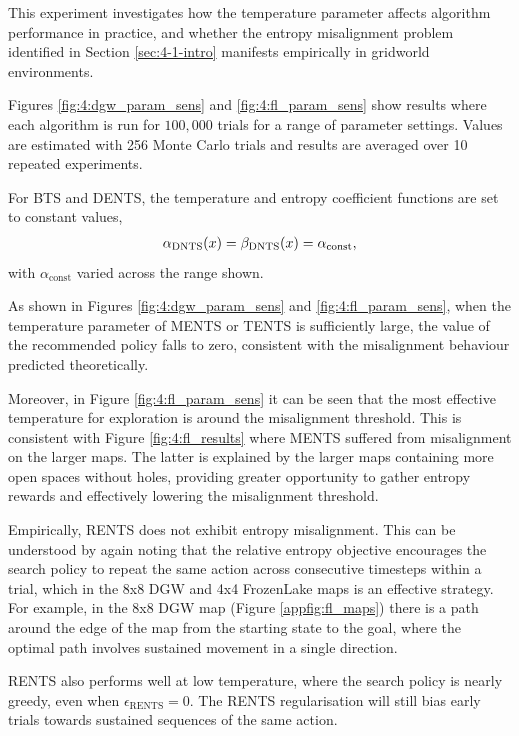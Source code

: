     This experiment investigates how the temperature parameter affects algorithm performance in practice, and whether the entropy misalignment problem identified in Section \ref{sec:4-1-intro} manifests empirically in gridworld environments.

    Figures \ref{fig:4:dgw_param_sens} and \ref{fig:4:fl_param_sens} show results where each algorithm is run for $100{,}000$ trials for a range of parameter settings. Values are estimated with 256 Monte Carlo trials and results are averaged over 10 repeated experiments.

    For BTS and DENTS, the temperature and entropy coefficient functions are set to constant values, 
    \begin{align}
        {\alpha_{{\textnormal{DNTS}}}}(x) = {\beta_{{\textnormal{DNTS}}}}(x) = \alpha_{\text{const}},
    \end{align} 
    with $\alpha_{\text{const}}$ varied across the range shown.
    
    As shown in Figures \ref{fig:4:dgw_param_sens} and \ref{fig:4:fl_param_sens}, when the temperature parameter of MENTS or TENTS is sufficiently large, the value of the recommended policy falls to zero, consistent with the misalignment behaviour predicted theoretically.

    Moreover, in Figure \ref{fig:4:fl_param_sens} it can be seen that the most effective temperature for exploration is around the misalignment threshold. This is consistent with Figure \ref{fig:4:fl_results} where MENTS suffered from misalignment on the larger maps. The latter is explained by the larger maps containing more open spaces without holes, providing greater opportunity to gather entropy rewards and effectively lowering the misalignment threshold.

    Empirically, RENTS does not exhibit entropy misalignment. This can be understood by again noting that the relative entropy objective encourages the search policy to repeat the same action across consecutive timesteps within a trial, which in the 8x8 DGW and 4x4 FrozenLake maps is an effective strategy. For example, in the 8x8 DGW map (Figure \ref{appfig:fl_maps}) there is a path around the edge of the map from the starting state to the goal, where the optimal path involves sustained movement in a single direction.

    RENTS also performs well at low temperature, where the search policy is nearly greedy, even when $\epsilon_{\text{RENTS}}=0$. The RENTS regularisation will still bias early trials towards sustained sequences of the same action.

